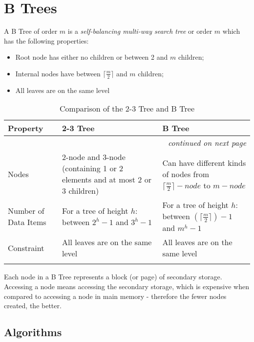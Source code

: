 
\section{B Trees}
A B Tree of order $m$ is a \textit{self-balancing multi-way search tree} or order $m$ which has the following properties:
\begin{itemize}
    \item Root node has either no children or between 2 and $m$ children;
    \item Internal nodes have between $\displaystyle \lceil \frac{m}{2} \rceil $ and $m$ children;
    \item All leaves are on the same level
\end{itemize}

{\RaggedRight \centering
    \begin{longtable}{p{} p{} p{}}
    \textbf{Property} & \textbf{2-3 Tree} & \textbf{B Tree}\\
    \hline
    \hline
    \endhead

    \multicolumn{3}{r}{\footnotesize\itshape continued on next page}\\
    \endfoot 

    \endlastfoot

    Nodes & 2-node and 3-node (containing 1 or 2 elements and at most 2 or 3 children) & Can have different kinds of nodes from $\displaystyle \lceil \frac{m}{2} \rceil - node$ to $m - node$\\
    \hline
    Number of Data Items & For a tree of height $h$: between $2^h-1$ and $3^h-1$ & For a tree of height $h$: between $\displaystyle (\lceil \frac{m}{2} \rceil) - 1$ and $m^h - 1$\\
    \hline
    Constraint & All leaves are on the same level & All leaves are on the same level\\
    \hline
    
    \caption{Comparison of the 2-3 Tree and B Tree}
    \end{longtable}
} %

Each node in a B Tree represents a block (or page) of secondary storage. Accessing a node means accessing the secondary storage, which is expensive when compared to accessing a node in main memory - therefore the fewer nodes created, the better. 

\subsection{Algorithms}
